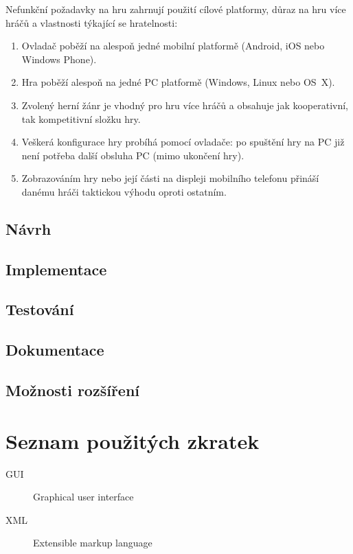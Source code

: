 \documentclass[thesis=B,czech,hidelinks]{FITthesis}[2012/06/26] %
\begin{document}
Nefunkční požadavky na hru zahrnují použití cílové platformy, důraz na hru více hráčů a vlastnosti týkající se hratelnosti:

\begin{enumerate}
	\item Ovladač poběží na alespoň jedné mobilní platformě (Android, iOS nebo Windows Phone).
	\item Hra poběží alespoň na jedné PC platformě (Windows, Linux nebo OS~X).
	\item Zvolený herní žánr je vhodný pro hru více hráčů a obsahuje jak kooperativní, tak kompetitivní složku hry.
	\item Veškerá konfigurace hry probíhá pomocí ovladače: po spuštění hry na PC již není potřeba další obsluha PC (mimo ukončení hry).
	\item Zobrazováním hry nebo její části na displeji mobilního telefonu přináší danému hráči taktickou výhodu oproti ostatním.
\end{enumerate}

\section{Návrh}



\section{Implementace}
\section{Testování}
\section{Dokumentace}
\section{Možnosti rozšíření}

\begin{conclusion}
	
	
\end{conclusion}




\appendix

\chapter{Seznam použitých zkratek}
\begin{description}
	\item[GUI] Graphical user interface
	\item[XML] Extensible markup language
\end{description}
\end{document}
